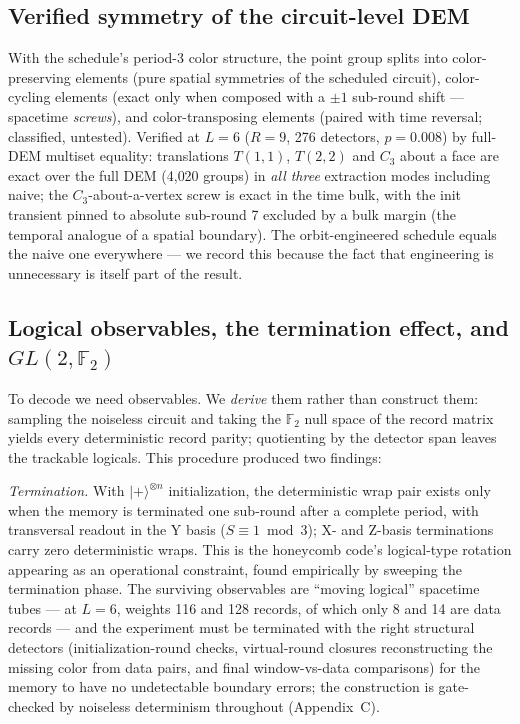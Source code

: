 \documentclass[11pt]{article}
\newcommand{\F}{\mathbb{F}}
\begin{document}
\subsection{Verified symmetry of the circuit-level DEM}

With the schedule's period-3 color structure, the point group splits into
color-preserving elements (pure spatial symmetries of the scheduled
circuit), color-cycling elements (exact only when composed with a $\pm 1$
sub-round shift --- spacetime \emph{screws}), and color-transposing elements
(paired with time reversal; classified, untested). Verified at $L = 6$
($R = 9$, 276 detectors, $p = 0.008$) by full-DEM multiset equality:
translations $T(1,1)$, $T(2,2)$ and $C_3$ about a face are exact over the
full DEM (4{,}020 groups) in \emph{all three} extraction modes including
naive; the $C_3$-about-a-vertex screw is exact in the time bulk, with the
init transient pinned to absolute sub-round 7 excluded by a bulk margin (the
temporal analogue of a spatial boundary). The orbit-engineered schedule
equals the naive one everywhere --- we record this because the fact that
engineering is unnecessary is itself part of the result.

\subsection{Logical observables, the termination effect, and $GL(2,\F_2)$}

To decode we need observables. We \emph{derive} them rather than construct
them: sampling the noiseless circuit and taking the $\F_2$ null space of the
record matrix yields every deterministic record parity; quotienting by the
detector span leaves the trackable logicals. This procedure produced two
findings:

\emph{Termination.} With $|+\rangle^{\otimes n}$ initialization, the
deterministic wrap pair exists only when the memory is terminated one
sub-round after a complete period, with transversal readout in the Y basis
($S \equiv 1 \bmod 3$); X- and Z-basis terminations carry zero deterministic
wraps. This is the honeycomb code's logical-type rotation \cite{HH21}
appearing as an operational constraint, found empirically by sweeping the
termination phase. The surviving observables are ``moving logical''
spacetime tubes --- at $L = 6$, weights 116 and 128 records, of which only 8
and 14 are data records --- and the experiment must be terminated with the
right structural detectors (initialization-round checks, virtual-round
closures reconstructing the missing color from data pairs, and final
window-vs-data comparisons) for the memory to have no undetectable boundary
errors; the construction is gate-checked by noiseless determinism throughout
(Appendix~C).
\end{document}
